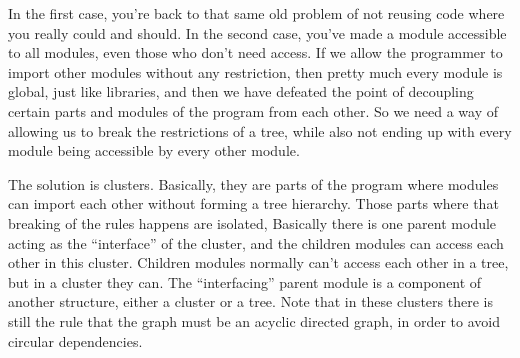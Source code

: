 \documentclass{article}
\begin{document}
In the first case, you’re back to that same old problem of not reusing code where you really could and should. In the second case, you’ve made a module accessible to all modules, even those who don’t need access. If we allow the programmer to import other modules without any restriction, then pretty much every module is global, just like libraries, and then we have defeated the point of decoupling certain parts and modules of the program from each other. So we need a way of allowing us to break the restrictions of a tree, while also not ending up with every module being accessible by every other module.




The solution is clusters. Basically, they are parts of the program where modules can import each other without forming a tree hierarchy. Those parts where that breaking of the rules happens are isolated, Basically there is one parent module acting as the “interface” of the cluster, and the children modules can access each other in this cluster. Children modules normally can’t access each other in a tree, but in a cluster they can. The “interfacing” parent module is a component of another structure, either a cluster or a tree. Note that in these clusters there is still the rule that the graph must be an acyclic directed graph, in order to avoid circular dependencies.
\end{document}
